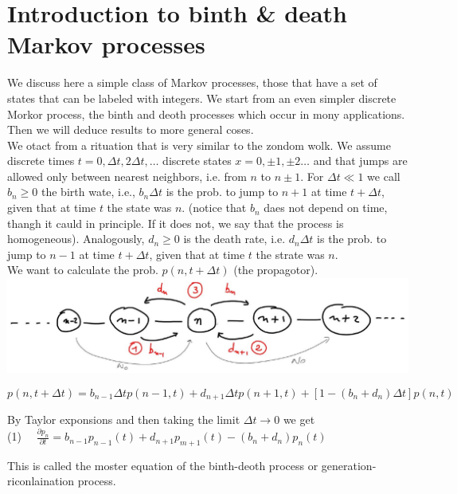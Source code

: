 \documentclass[10pt]{article}
\begin{document}
\section*{Introduction to binth \& death Markov processes}
We discuss here a simple class of Markov processes, those that have a set of states that can be labeled with integers. We start from an even simpler discrete Morkor process, the binth and deoth processes which occur in mony applications. Then we will deduce results to more general coses.\\
We otact from a rituation that is very similar to the zondom wolk. We assume discrete times $t=0, \Delta t, 2 \Delta t, \ldots$ discrete states $x=0, \pm 1, \pm 2 \ldots$ and that jumps are allowed only between nearest neighbors, i.e. from $n$ to $n \pm 1$. For $\Delta t \ll 1$ we call $b_{n} \geqslant 0$ the birth wate, i.e., $b_{n} \Delta t$ is the prob. to jump to $n+1$ at time $t+\Delta t$, given that at time $t$ the state was $n$. (notice that $b_{n}$ daes not depend on time, thangh it cauld in principle. If it does not, we say that the process is homogeneous). Analogously, $d_{n} \geqslant 0$ is the death rate, i.e. $d_{n} \Delta t$ is the prob. to jump to $n-1$ at time $t+\Delta t$, given that at time $t$ the strate was $n$.\\
We want to calculate the prob. $p(n, t+\Delta t)$ (the propagotor).\\
\includegraphics[max width=\textwidth, center]{2025_10_17_3daf2a002a8f5936c90eg-01}


\begin{equation*}
p(n, t+\Delta t)=b_{n-1} \Delta t p(n-1, t)+d_{n+1} \Delta t p(n+1, t)+\left[1-\left(b_{n}+d_{n}\right) \Delta t\right] p(n, t) \tag{1}
\end{equation*}


By Taylor exponsions and then taking the limit $\Delta t \rightarrow 0$ we get\\
(1) $\quad \frac{\partial p_{n}}{\partial t}=b_{n-1} p_{n-1}(t)+d_{n+1} p_{m+1}(t)-\left(b_{n}+d_{n}\right) p_{n}(t)$

This is called the moster equation of the binth-deoth process or generation-riconlaination process.
\end{document}

